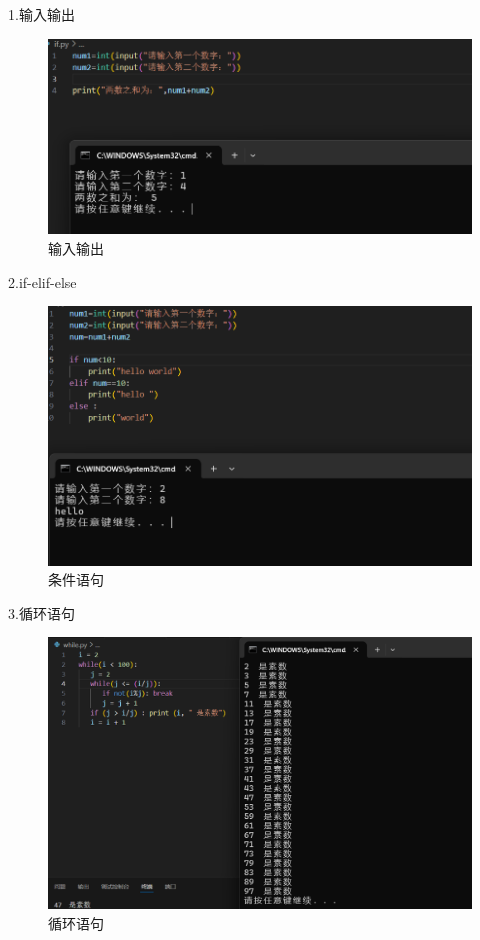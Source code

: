 \documentclass[a4paper, 12pt]{article}
\begin{document}
1.输入输出
\begin{figure}[H]
  \centering
  \includegraphics[width=1\textwidth]{屏幕截图 2024-09-11 214843.png}
  \caption{输入输出}
    \end{figure}

2.if-elif-else
\begin{figure}[H]
  \centering
  \includegraphics[width=1\textwidth]{屏幕截图 2024-09-11 215453.png}
  \caption{条件语句}
    \end{figure}

3.循环语句
\begin{figure}[H]
  \centering
  \includegraphics[width=1\textwidth]{屏幕截图 2024-09-06 145233.png}
  \caption{循环语句}
    \end{figure}
\end{document}

